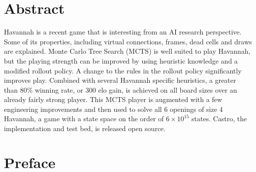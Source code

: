 
  \newpage
  \chapter*{Abstract}
  \thispagestyle{empty}
  \vspace*{-0.7in}
  \renewcommand{\baselinestretch}{1.8}
  \normalsize{

Havannah is a recent game that is interesting from an AI research perspective. Some of its properties, including virtual connections, frames, dead cells and draws are explained. Monte Carlo Tree Search (MCTS) is well suited to play Havannah, but the playing strength can be improved by using heuristic knowledge and a modified rollout policy. A change to the rules in the rollout policy significantly improves play. Combined with several Havannah specific heuristics, a greater than 80\% winning rate, or 300 elo gain, is achieved on all board sizes over an already fairly strong player. This MCTS player is augmented with a few engineering improvements and then used to solve all 6 openings of size 4 Havannah, a game with a state space on the order of $6 \times 10^{15}$ states. Castro, the implementation and test bed, is released open source.

  }

  \renewcommand{\baselinestretch}{1.33}

  \newpage
  \chapter*{Preface}
  \thispagestyle{empty}
  \vspace*{-0.7in}

